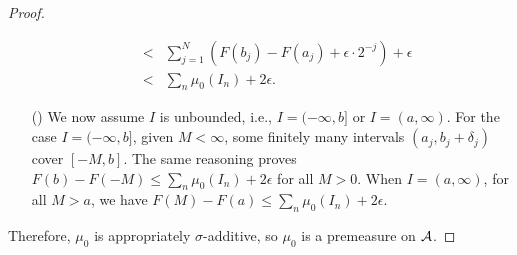 \begin{proof}
\begin{enumerate}
{\begin{eqnarray*}
                &<&\sum_{j=1}^N(F(b_j)-F(a_j)+\epsilon\cdot 2^{-j})+\epsilon\\
                &<&\sum_n\mu_0(I_n)+2\epsilon.
            \end{eqnarray*}
        }
        \item[(\romannumeral 2)]
        {
            We now assume $I$ is unbounded, i.e., $I=(-\infty, b]$ or $I=(a, \infty)$.
            For the case $I=(-\infty, b]$, given $M<\infty$, some finitely many intervals $(a_j, b_j+\delta_j)$ cover $[-M, b]$.
            The same reasoning proves $F(b)-F(-M)\leq\sum_n\mu_0(I_n)+2\epsilon$ for all $M>0$.
            When $I=(a, \infty)$, for all $M>a$, we have $F(M)-F(a)\leq\sum_n\mu_0(I_n)+2\epsilon$.
        }
    \end{enumerate}
    Therefore, $\mu_0$ is appropriately $\sigma$-additive, so $\mu_0$ is a premeasure on ${\mathcal{A}}$.  
\end{proof}

